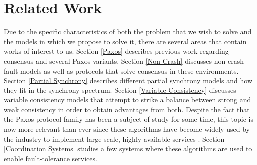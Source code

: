 \chapter{Related Work} \label{Related Work}

Due to the specific characteristics of both the problem that we wish to solve and the models in which we propose to solve it, there are several areas that contain works of interest to us. Section \ref{Paxos} describes previous work regarding consensus and several Paxos variants. Section \ref{Non-Crash} discusses non-crash fault models as well as protocols that solve consensus in these environments. Section \ref{Partial Synchrony} describes different partial synchrony models and how they fit in the synchrony spectrum. Section \ref{Variable Consistency} discusses variable consistency models that attempt to strike a balance between strong and weak consistency in order to obtain advantages from both. Despite the fact that the Paxos protocol family has been a subject of study for some time, this topic is now more relevant than ever since these algorithms have become widely used by the industry to implement large-scale, highly available services \cite{Burrows2006,Hunt2010}. Section \ref{Coordination Systems} studies a few systems where these algorithms are used to enable fault-tolerance services.

